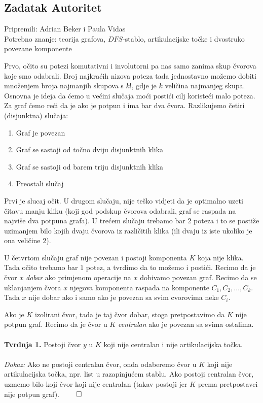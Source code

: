 \subsection*{Zadatak Autoritet}
\textsf{Pripremili: Adrian Beker i Paula Vidas}\\
\textsf{Potrebno znanje: teorija grafova, $DFS$-stablo, artikulacijske točke i dvostruko povezane komponente}

Prvo, očito su potezi komutativni i involutorni pa nas samo zanima skup čvorova koje smo odabrali. Broj najkraćih nizova poteza tada jednostavno možemo dobiti množenjem broja najmanjih skupova s $k!$, gdje je $k$ veličina najmanjeg skupa. Osnovna je ideja da ćemo u većini slučaja moći postići cilj koristeći malo poteza. Za graf ćemo reći da je  ako je potpun i ima bar dva čvora. Razlikujemo četiri (disjunktna) slučaja:

\begin{enumerate}
    \item Graf je povezan
    \item Graf se sastoji od točno dviju disjunktnih klika
    \item Graf se sastoji od barem triju disjunktnih klika
    \item Preostali slučaj
\end{enumerate}
Prvi je slucaj očit. U drugom slučaju, nije teško vidjeti da je optimalno uzeti čitavu manju kliku (koji god podskup čvorova odabrali, graf se raspada na najviše dva potpuna grafa).
U trećem slučaju trebamo bar $2$ poteza i to se postiže uzimanjem bilo kojih dvaju čvorova iz različitih klika (ili dvaju iz iste ukoliko je ona veličine $2$).

U četvrtom slučaju graf nije povezan i postoji komponenta $K$ koja nije klika. Tada očito trebamo bar $1$ potez, a tvrdimo da to možemo i postići. Recimo da je čvor $x$ \textit{dobar} ako primjenom operacije na $x$ dobivamo povezan graf. Recimo da se uklanjanjem čvora $x$ njegova komponenta raspada na komponente $C_1, C_2, …, C_k$. Tada $x$ nije dobar ako i samo ako je povezan sa svim cvorovima neke $C_i$.

Ako je $K$ izolirani čvor, tada je taj čvor dobar, stoga pretpostavimo da $K$ nije potpun graf. Recimo da je čvor u $K$ \textit{centralan} ako je povezan sa svima ostalima.
\\\\
\textbf{Tvrdnja 1.} Postoji čvor $y$ u $K$ koji nije centralan i nije artikulacijska točka.
\\\\
\textit{Dokaz:} Ako ne postoji centralan čvor, onda odaberemo čvor u $K$ koji nije artikulacijska točka, npr. list u razapinjućem stablu. Ako postoji centralan čvor, uzmemo bilo koji čvor koji nije centralan (takav postoji jer $K$ prema pretpostavci nije potpun graf). $\qed$

